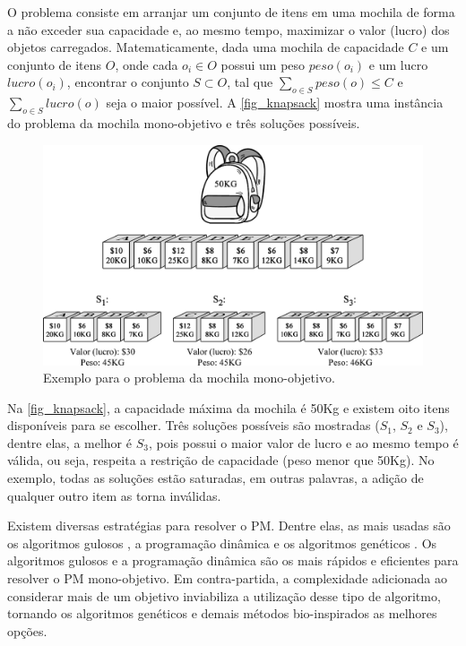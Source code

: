 O problema consiste em arranjar um conjunto de itens em uma mochila de forma a não exceder sua capacidade e, ao mesmo tempo, maximizar o valor (lucro) dos objetos carregados. Matematicamente, dada uma mochila de capacidade $C$ e um conjunto de itens $O$, onde cada $o_i \in O$ possui um peso $peso(o_i)$ e um lucro $lucro(o_i)$, encontrar o conjunto $S \subset O$, tal que $\sum_{o \in S} peso(o) \leq C$ e $\sum_{o \in S} lucro(o)$ seja o maior possível. A \autoref{fig_knapsack} mostra uma instância do problema da mochila mono-objetivo e três soluções possíveis.

\begin{figure}[!htbp]
	\centering
	\includegraphics[width=1\textwidth]{cap_problemas/figs/mochila.png}
	\caption{\label{fig_knapsack}Exemplo para o problema da mochila mono-objetivo.}
\end{figure}

Na \autoref{fig_knapsack}, a capacidade máxima da mochila é 50Kg e existem oito itens disponíveis para se escolher. Três soluções possíveis são mostradas ($S_1$, $S_2$ e $S_3$), dentre elas, a melhor é $S_3$, pois possui o maior valor de lucro e ao mesmo tempo é válida, ou seja, respeita a restrição de capacidade (peso menor que 50Kg). No exemplo, todas as soluções estão saturadas, em outras palavras, a adição de qualquer outro item as torna inválidas.

Existem diversas estratégias para resolver o \ac{PM}. Dentre elas, as mais usadas são os algoritmos gulosos \cite{KnapsackGreedy}, a programação dinâmica \cite{KnapsackDynamic} e os algoritmos genéticos \cite{KnapsackGA}. Os algoritmos gulosos e a programação dinâmica são os mais rápidos e eficientes para resolver o PM mono-objetivo. Em contra-partida, a complexidade adicionada ao considerar mais de um objetivo inviabiliza a utilização desse tipo de algoritmo, tornando os algoritmos genéticos e demais métodos bio-inspirados as melhores opções.

